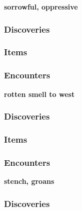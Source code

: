 \textbf{sorrowful, oppressive}
\begin{DndReadAloud}
\end{DndReadAloud}
\subsubsection{Discoveries}
\begin{itemize}
\end{itemize}
\subsubsection{Items}
\begin{itemize}
\end{itemize}
\subsubsection{Encounters}
\begin{itemize}
\end{itemize}


\textbf{rotten smell to west}
\begin{DndReadAloud}
\end{DndReadAloud}
\subsubsection{Discoveries}
\begin{itemize}
\end{itemize}
\subsubsection{Items}
\begin{itemize}
\end{itemize}
\subsubsection{Encounters}
\begin{itemize}
\end{itemize}


\textbf{stench, groans}
\begin{DndReadAloud}
\end{DndReadAloud}
\subsubsection{Discoveries}
\begin{itemize}
\end{itemize}
